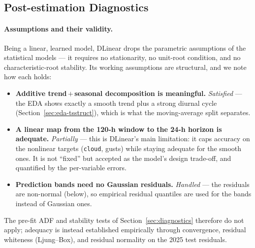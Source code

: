 \documentclass[12pt,a4paper,oneside]{report}
\begin{document}
\subsection{Post-estimation Diagnostics}
\label{sec:dlinear-diag}
\paragraph{Assumptions and their validity.}
Being a linear, learned model, DLinear drops the parametric assumptions of the
statistical models --- it requires no stationarity, no unit-root condition, and no
characteristic-root stability. Its working assumptions are structural, and we note
how each holds:
\begin{itemize}
  \item \textbf{Additive trend\,$+$\,seasonal decomposition is meaningful.}
        \emph{Satisfied} --- the EDA shows exactly a smooth trend plus a strong
        diurnal cycle (Section~\ref{sec:eda-tsstruct}), which is what the
        moving-average split separates.
  \item \textbf{A linear map from the 120-h window to the 24-h horizon is adequate.}
        \emph{Partially} --- this is DLinear's main limitation: it caps accuracy on
        the nonlinear targets (\texttt{cloud}, gusts) while staying adequate for the
        smooth ones. It is not ``fixed'' but accepted as the model's design trade-off,
        and quantified by the per-variable errors.
  \item \textbf{Prediction bands need no Gaussian residuals.} \emph{Handled} --- the
        residuals are non-normal (below), so empirical residual quantiles are used
        for the bands instead of Gaussian ones.
\end{itemize}
The pre-fit ADF and stability tests of Section~\ref{sec:diagnostics} therefore do
not apply; adequacy is instead established empirically through convergence, residual
whiteness (Ljung--Box), and residual normality on the 2025 test residuals.
\end{document}
